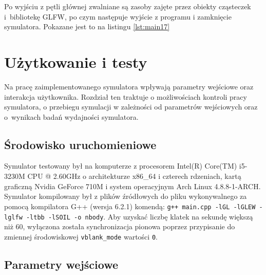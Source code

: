 \documentclass[12pt, twoside, openany]{report}
\begin{document}








Po wyjściu z pętli głównej zwalniane są zasoby zajęte przez obiekty cząsteczek i~bibliotekę GLFW, po czym następuje wyjście z programu i zamknięcie symulatora. Pokazane jest to na listingu \ref{lst:main17}



\chapter{Użytkowanie i testy}

Na pracę zaimplementowanego symulatora wpływają parametry wejściowe oraz interakcja użytkownika. Rozdział ten traktuje o możliwościach kontroli pracy symulatora, o przebiegu symulacji w zależności od parametrów wejściowych oraz o~wynikach badań wydajności symulatora.

\section{Środowisko uruchomieniowe}

Symulator testowany był na komputerze z procesorem Intel(R) Core(TM) i5-3230M CPU @ 2.60GHz o architekturze x86\_64 i czterech rdzeniach, kartą graficzną Nvidia GeForce 710M i system operacyjnym Arch Linux 4.8.8-1-ARCH.
Symulator kompilowany był z plików źródłowych do pliku wykonywalnego za pomocą kompilatora G++ (wersja 6.2.1) komendą: \texttt{g++ main.cpp -lGL -lGLEW -lglfw -ltbb -lSOIL -o nbody}.
Aby uzyskać liczbę klatek na sekundę większą niż 60, wyłączona została synchronizacja pionowa poprzez przypisanie do zmiennej środowiskowej \texttt{vblank\_mode} wartości \texttt 0.

\section{Parametry wejściowe}
\label{parametry_wejsciowe}
\end{document}
